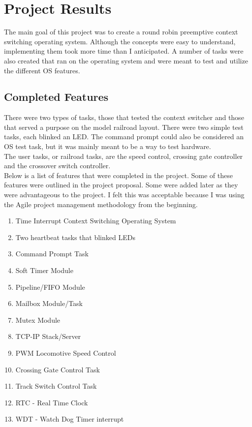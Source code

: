 \documentclass[acmlarge,screen]{acmart}
\begin{document}
\section{Project Results}
The main goal of this project was to create a round robin preemptive context switching operating system. Although the concepts were easy to understand, implementing them took more time than I anticipated. A number of tasks were also created that ran on the operating system and were meant to test and utilize the different OS features.\\
\subsection{Completed Features}
There were two types of tasks, those that tested the context switcher and those that served a purpose on the model railroad layout. There were two simple test tasks, each blinked an LED. The command prompt could also be considered an OS test task, but it was mainly meant to be a way to test hardware.\\
The user tasks, or railroad tasks, are the speed control, crossing gate controller and the crossover switch controller.\\
Below is a list of features that were completed in the project. Some of these features were outlined in the project proposal. Some were added later as they were advantageous to the project. I felt this was acceptable because I was using the Agile project management methodology from the beginning.
\begin{enumerate}
\item Time Interrupt Context Switching Operating System
\item Two heartbeat tasks that blinked LEDs
\item Command Prompt Task
\item Soft Timer Module
\item Pipeline/FIFO Module
\item Mailbox Module/Task
\item Mutex Module
\item TCP-IP Stack/Server
\item PWM Locomotive Speed Control
\item Crossing Gate Control Task
\item Track Switch Control Task
\item RTC - Real Time Clock
\item WDT - Watch Dog Timer interrupt
\end{enumerate}
\end{document}
